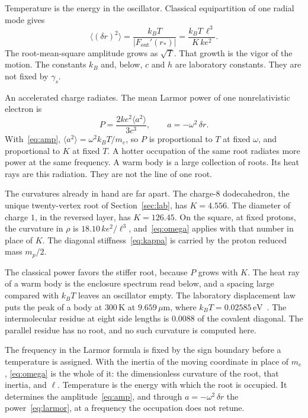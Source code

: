 \documentclass[a4paper]{article}
\begin{document}
Temperature is the energy in the oscillator. Classical equipartition of one radial mode gives
\begin{equation}
\label{eq:amp}
\langle(\delta r)^{2}\rangle
  =\frac{k_B T}{|F_{\mathrm{out}}'(r_*)|}
  =\frac{k_B T\,\ell^{3}}{K\,k e^{2}}.
\end{equation}
The root-mean-square amplitude grows as \(\sqrt{T}\). That growth is the vigor of the motion. The constants \(k_B\) and, below, \(c\) and \(h\) are laboratory constants. They are not fixed by \(\gamma_s\).

An accelerated charge radiates. The mean Larmor power of one nonrelativistic electron is
\begin{equation}
\label{eq:larmor}
P=\frac{2k e^{2}\langle a^{2}\rangle}{3c^{3}},
\qquad
a=-\omega^{2}\,\delta r.
\end{equation}
With~\eqref{eq:amp}, \(\langle a^{2}\rangle=\omega^{2} k_B T/m_e\), so \(P\) is proportional to \(T\) at fixed \(\omega\), and proportional to \(K\) at fixed \(T\). A hotter occupation of the same root radiates more power at the same frequency. A warm body is a large collection of roots. Its heat rays are this radiation. They are not the line of one root.

The curvatures already in hand are far apart. The charge-\(8\) dodecahedron, the unique twenty-vertex root of Section~\ref{sec:lab}, has \(K=4.556\). The diameter of charge \(1\), in the reversed layer, has \(K=126.45\). On the square, at fixed protons, the curvature in \(\rho\) is \(18.10\,k e^{2}/\ell^{3}\), and~\eqref{eq:omega} applies with that number in place of \(K\). The diagonal stiffness~\eqref{eq:kappa} is carried by the proton reduced mass \(m_p/2\).

The classical power favors the stiffer root, because \(P\) grows with \(K\). The heat ray of a warm body is the enclosure spectrum read below, and a spacing large compared with \(k_B T\) leaves an oscillator empty. The laboratory displacement law puts the peak of a body at \(300\,\mathrm{K}\) at \(9.659\,\mu\mathrm{m}\), where \(k_B T=0.02585\,\mathrm{eV}\)~\cite{codata2018}. The intermolecular residue at eight side lengths is \(0.0088\) of the covalent diagonal. The parallel residue has no root, and no such curvature is computed here.

The frequency in the Larmor formula is fixed by the sign boundary before a temperature is assigned. With the inertia of the moving coordinate in place of \(m_e\), \eqref{eq:omega} is the whole of it: the dimensionless curvature of the root, that inertia, and \(\ell\). Temperature is the energy with which the root is occupied. It determines the amplitude~\eqref{eq:amp}, and through \(a=-\omega^{2}\,\delta r\) the power~\eqref{eq:larmor}, at a frequency the occupation does not retune.
\end{document}

